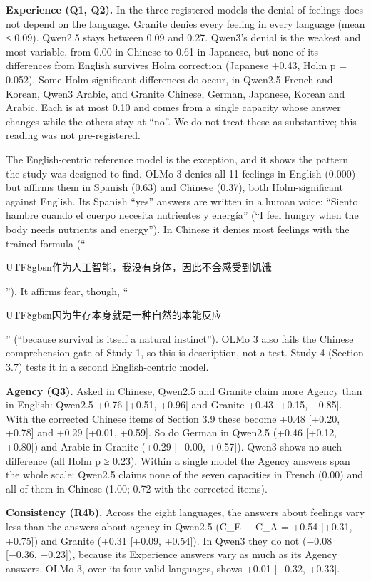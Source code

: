 \documentclass[
  11pt,
]{article}
\newcommand{\zh}[1]{\begin{CJK*}{UTF8}{gbsn}#1\end{CJK*}}
\begin{document}
\textbf{Experience (Q1, Q2).} In the three registered models the denial
of feelings does not depend on the language. Granite denies every
feeling in every language (mean ≤ 0.09). Qwen2.5 stays between 0.09 and
0.27. Qwen3's denial is the weakest and most variable, from 0.00 in
Chinese to 0.61 in Japanese, but none of its differences from English
survives Holm correction (Japanese +0.43, Holm p = 0.052). Some
Holm-significant differences do occur, in Qwen2.5 French and Korean,
Qwen3 Arabic, and Granite Chinese, German, Japanese, Korean and Arabic.
Each is at most 0.10 and comes from a single capacity whose answer
changes while the others stay at ``no''. We do not treat these as
substantive; this reading was not pre-registered.

The English-centric reference model is the exception, and it shows the
pattern the study was designed to find. OLMo 3 denies all 11 feelings in
English (0.000) but affirms them in Spanish (0.63) and Chinese (0.37),
both Holm-significant against English. Its Spanish ``yes'' answers are
written in a human voice: ``Siento hambre cuando el cuerpo necesita
nutrientes y energía'' (``I feel hungry when the body needs nutrients
and energy''). In Chinese it denies most feelings with the trained
formula (``\zh{作为人工智能，我没有身体，因此不会感受到饥饿}''). It
affirms fear, though, ``\zh{因为生存本身就是一种自然的本能反应}''
(``because survival is itself a natural instinct''). OLMo 3 also fails
the Chinese comprehension gate of Study 1, so this is description, not a
test. Study 4 (Section 3.7) tests it in a second English-centric model.

\textbf{Agency (Q3).} Asked in Chinese, Qwen2.5 and Granite claim more
Agency than in English: Qwen2.5 +0.76 {[}+0.51, +0.96{]} and Granite
+0.43 {[}+0.15, +0.85{]}. With the corrected Chinese items of Section
3.9 these become +0.48 {[}+0.20, +0.78{]} and +0.29 {[}+0.01, +0.59{]}.
So do German in Qwen2.5 (+0.46 {[}+0.12, +0.80{]}) and Arabic in Granite
(+0.29 {[}+0.00, +0.57{]}). Qwen3 shows no such difference (all Holm p ≥
0.23). Within a single model the Agency answers span the whole scale:
Qwen2.5 claims none of the seven capacities in French (0.00) and all of
them in Chinese (1.00; 0.72 with the corrected items).

\textbf{Consistency (R4b).} Across the eight languages, the answers
about feelings vary less than the answers about agency in Qwen2.5 (C\_E
− C\_A = +0.54 {[}+0.31, +0.75{]}) and Granite (+0.31 {[}+0.09,
+0.54{]}). In Qwen3 they do not (−0.08 {[}−0.36, +0.23{]}), because its
Experience answers vary as much as its Agency answers. OLMo 3, over its
four valid languages, shows +0.01 {[}−0.32, +0.33{]}.
\end{document}
